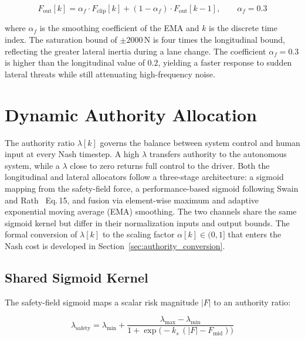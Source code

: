 \documentclass[12pt,a4paper,oneside]{report}
\begin{document}
\begin{equation}
F_{\mathrm{out}}[k] = \alpha_f \cdot F_{\mathrm{clip}}[k] + (1 - \alpha_f)\cdot F_{\mathrm{out}}[k-1], \qquad \alpha_f = 0.3
\label{eq:lat_ema}
\end{equation}

where $\alpha_f$ is the smoothing coefficient of the EMA and $k$ is the discrete time index. The saturation bound of $\pm 2000\,\mathrm{N}$ is four times the longitudinal bound, reflecting the greater lateral inertia during a lane change. The coefficient $\alpha_f = 0.3$ is higher than the longitudinal value of $0.2$, yielding a faster response to sudden lateral threats while still attenuating high-frequency noise.

\section{Dynamic Authority Allocation}
\label{sec:authority_allocation}

The authority ratio $\lambda[k]$ governs the balance between system control and human input at every Nash timestep. A high $\lambda$ transfers authority to the autonomous system, while a $\lambda$ close to zero returns full control to the driver. Both the longitudinal and lateral allocators follow a three-stage architecture: a sigmoid mapping from the safety-field force, a performance-based sigmoid following Swain and Rath~\cite{swainCooperativeGameTheory2023} Eq.\,15, and fusion via element-wise maximum and adaptive exponential moving average (EMA) smoothing. The two channels share the same sigmoid kernel but differ in their normalization inputs and output bounds. The formal conversion of $\lambda[k]$ to the scaling factor $\alpha[k] \in (0, 1]$ that enters the Nash cost is developed in Section~\ref{sec:authority_conversion}.


\subsection{Shared Sigmoid Kernel}
\label{sec:authority_sigmoid}

The safety-field sigmoid maps a scalar risk magnitude $|F|$ to an authority ratio:

\begin{equation}
\lambda_{\mathrm{safety}} = \lambda_{\min} + \frac{\lambda_{\max} - \lambda_{\min}}{1 + \exp\!\bigl(-k_s\,(|F| - F_{\mathrm{mid}})\bigr)}
\label{eq:safety_sigmoid}
\end{equation}
\end{document}

